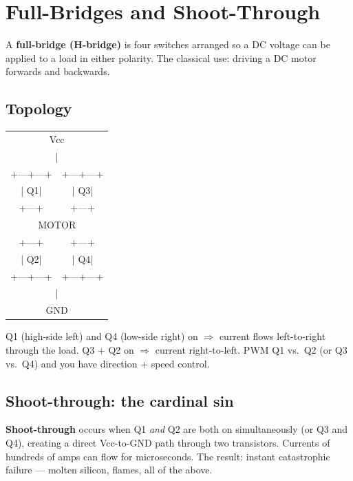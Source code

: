 \documentclass[11pt,a4paper]{article}
\begin{document}
\section{Full-Bridges and Shoot-Through}

A \textbf{full-bridge (H-bridge)} is four switches arranged so a DC
voltage can be applied to a load in either polarity. The classical use:
driving a DC motor forwards and backwards.

\subsection{Topology}

\begin{center}
\begin{tabular}{cc}
\multicolumn{2}{c}{Vcc} \\
\multicolumn{2}{c}{|}\\
+---+---+ & +---+---+ \\
| Q1| & | Q3| \\
+---+ & +---+ \\
\multicolumn{2}{c}{ \quad MOTOR \quad } \\
+---+ & +---+ \\
| Q2| & | Q4| \\
+---+---+ & +---+---+ \\
\multicolumn{2}{c}{|} \\
\multicolumn{2}{c}{GND} \\
\end{tabular}
\end{center}

Q1 (high-side left) and Q4 (low-side right) on $\Rightarrow$ current flows
left-to-right through the load. Q3 + Q2 on $\Rightarrow$ current right-to-left.
PWM Q1 vs.\ Q2 (or Q3 vs.\ Q4) and you have direction + speed control.

\subsection{Shoot-through: the cardinal sin}

\textbf{Shoot-through} occurs when Q1 \emph{and} Q2 are both on
simultaneously (or Q3 and Q4), creating a direct Vcc-to-GND path through
two transistors. Currents of hundreds of amps can flow for microseconds.
The result: instant catastrophic failure --- molten silicon, flames,
all of the above.
\end{document}
